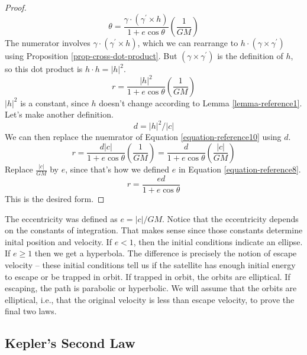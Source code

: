 \documentclass[fleqn,letterpaper]{report}
\begin{document}
\begin{proof}
\begin{equation*}
{\theta} = \frac{\gamma \cdot (\gamma^\prime \times h) } { 1 + e \cos
\theta} \left( \frac{1}{GM} \right) 
\end{equation*}
The numerator involves $\gamma \cdot (\gamma^\prime \times
h)$, which we can rearrange to $h \cdot (\gamma \times
\gamma^\prime)$ using Proposition \ref{prop-cross-dot-product}. But
$(\gamma \times \gamma^\prime)$ is the definition of $h$, so
this dot product is $h\cdot h = |h|^2$. 
\begin{equation}
\label{equation-reference10}
r = \frac{|h|^2 } { 1 + e \cos
\theta} \left( \frac{1}{GM} \right) 
\end{equation}
$|h|^2$ is a constant, since $h$ doesn't change according to
Lemma \ref{lemma-reference1}. Let's make another definition.
\begin{equation}
\label{equation-reference9}
d = |h|^2/|c|
\end{equation}
We can then replace the nuemrator of Equation
\ref{equation-reference10} using $d$. 
\begin{equation*}
r = \frac{d|c|} { 1 + e \cos
\theta} \left( \frac{1}{GM} \right) 
= \frac{d} { 1 + e \cos
\theta} \left( \frac{|c|}{GM} \right) 
\end{equation*}
Replace $\frac{|c|}{GM}$ by $e$, since that's how we defined
$e$ in Equation \ref{equation-reference8}.
\begin{equation*}
r = \frac{ed } { 1 + e \cos \theta} 
\end{equation*}
This is the desired form.
\end{proof}

The eccentricity was defined as $e = |c|/GM$.  Notice that the
eccentricity depends on the constants of integration. That
makes sense since those constants determine inital position
and velocity.  If $e<1$, then the initial conditions indicate
an ellipse. If $e \geq1$ then we get a hyperbola. The
difference is precisely the notion of escape velocity -- these
initial conditions tell us if the satellite has enough initial
energy to escape or be trapped in orbit. If trapped in orbit,
the orbits are elliptical. If escaping, the path is parabolic
or hyperbolic. We will assume that the orbits are elliptical,
i.e., that the original velocity is less than escape velocity,
to prove the final two laws.

\subsection{Kepler's Second Law}
\label{kepler-second}
\end{document}
